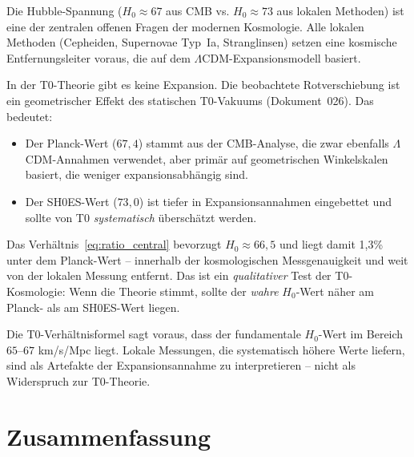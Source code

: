 Die Hubble-Spannung ($H_0 \approx 67$ aus CMB vs. $H_0 \approx 73$ aus
lokalen Methoden) ist eine der zentralen offenen Fragen der modernen
Kosmologie. Alle lokalen Methoden (Cepheiden, Supernovae Typ~Ia,
Stranglinsen) setzen eine kosmische Entfernungsleiter voraus, die
auf dem $\Lambda$CDM-Expansionsmodell basiert.

In der T0-Theorie gibt es keine Expansion. Die beobachtete
Rotverschiebung ist ein geometrischer Effekt des statischen
T0-Vakuums (Dokument~026). Das bedeutet:

\begin{itemize}
    \item Der Planck-Wert ($67{,}4$) stammt aus der CMB-Analyse, die
          zwar ebenfalls $\Lambda$CDM-Annahmen verwendet, aber
          primär auf geometrischen Winkelskalen basiert, die
          weniger expansionsabhängig sind.
    \item Der SH0ES-Wert ($73{,}0$) ist tiefer in
          Expansionsannahmen eingebettet und sollte von T0
          \emph{systematisch} überschätzt werden.
\end{itemize}

Das Verhältnis~\eqref{eq:ratio_central} bevorzugt $H_0 \approx 66{,}5$
und liegt damit 1,3\% unter dem Planck-Wert -- innerhalb der
kosmologischen Messgenauigkeit und weit von der lokalen Messung entfernt.
Das ist ein \emph{qualitativer} Test der T0-Kosmologie: Wenn die Theorie
stimmt, sollte der \emph{wahre} $H_0$-Wert näher am Planck- als am
SH0ES-Wert liegen.

\begin{keyresult}
    Die T0-Verhältnisformel sagt voraus, dass der fundamentale $H_0$-Wert
    im Bereich $65$--$67$ km/s/Mpc liegt. Lokale Messungen, die
    systematisch höhere Werte liefern, sind als Artefakte der
    Expansions\-annahme zu interpretieren -- nicht als
    Widerspruch zur T0-Theorie.
\end{keyresult}

\section{Zusammenfassung}
\label{sec:zusammenfassung}

